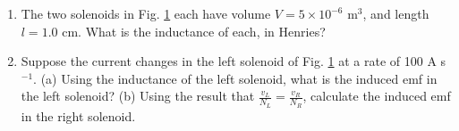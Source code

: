 \documentclass[10pt]{article}
\begin{document}
\begin{enumerate}
\begin{enumerate}
\begin{figure}
\caption{\label{fig:trans} (Left) A magnetic field passes through loops of wire.  (Right) The loops are stretched, reducing the area.}
\end{figure}
In Fig. \ref{fig:trans} (left) a \textit{transformer} is depicted.  The gray square represents an iron core which ensures that the magnitude of the magnetic flux through the left solenoid \textbf{is identical to} the magnetic flux on the right solenoid.  Both solenoids are $L = 5$ cm long.  Suppose the left solenoid has $N_L = 500$ turns, and the right solenoid has $N_R = 1000$ turns.  Let the induced emf in the left solenoid be $v_L$, and the induced emf in the right solenoid be $v_R$.  Show that
\begin{equation}
\frac{v_L}{N_L} = \frac{v_R}{N_R}
\end{equation} \\ \vspace{3cm}
\item The two solenoids in Fig. \ref{fig:trans} each have volume $V = 5 \times 10^{-6}$ m$^3$, and length $l = 1.0$ cm.  What is the inductance of each, in Henries? \\ \vspace{3cm}
\item Suppose the current changes in the left solenoid of Fig. \ref{fig:trans} at a rate of 100 A s$^{-1}$.  (a) Using the inductance of the left solenoid, what is the induced emf in the left solenoid? (b) Using the result that $\frac{v_L}{N_L} = \frac{v_R}{N_R}$, calculate the induced emf in the right solenoid. \\ \vspace{4cm}
\end{enumerate}
\end{enumerate}
\end{document}
